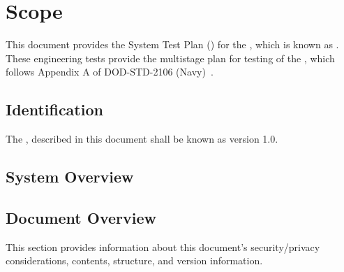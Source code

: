 
\chapter{Scope}
\label{loc:Scope}


This document provides the System Test Plan (\STP) for the \ThisSystem, which is known as \ThisSys.
These engineering tests provide the multistage plan for testing of the \ThisSys, which follows Appendix A of DOD-STD-2106 (Navy)~\cite{ref__DOD_STD_2106_NAVY}.


\section{Identification}


The \ThisSys, described in this document shall be known as \ThisSys version 1.0.


\section{System Overview}
\label{loc:SystemOverview}





\section{Document Overview}
\label{loc:DocumentOverview}


This section provides information about this document's security/privacy considerations, contents, structure, and version information.

% 

% 

% 


